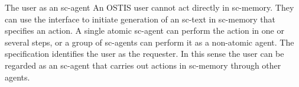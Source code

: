 \begin{frame}{The user as an sc-agent}
		\topline
	\justifying
	An OSTIS user cannot act directly in sc-memory. They can use the interface to initiate generation of an sc-text in sc-memory that specifies an action. A single atomic sc-agent can perform the action in one or several steps, or a group of sc-agents can perform it as a non-atomic agent. The specification identifies the user as the requester. In this sense the user can be regarded as an sc-agent that carries out actions in sc-memory through other agents.
\end{frame}
